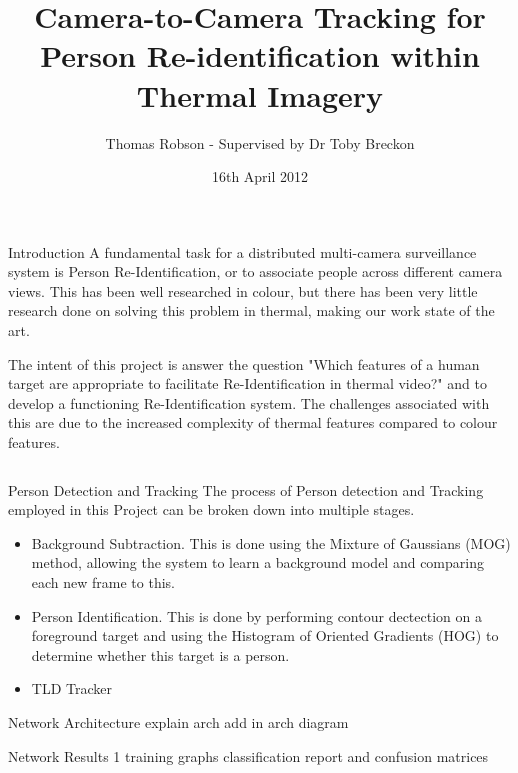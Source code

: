 \documentclass[final]{beamer}
\title[Thermal Re-ID]{Camera-to-Camera Tracking for Person Re-identification within Thermal Imagery}
\author[G Ingram]{Thomas Robson - Supervised by Dr Toby Breckon}
\institute[Durham]{School of Computer Science, Durham University}
\date{16th April 2012}
\begin{document}
  \begin{frame}{} 

  \vfill
  \begin{block}{Introduction}
          A fundamental task for a distributed multi-camera surveillance system is Person Re-Identification, or to associate people across different camera views. This has been well researched in colour, but there has been very little research done on solving this problem in thermal, making our work state of the art. 

The intent of this project is answer the question "Which features of a human target are appropriate to facilitate Re-Identification in thermal video?" and to develop a functioning Re-Identification system. The challenges associated with this are due to the increased complexity of thermal features compared to colour features.
        \end{block}
        
    \begin{columns}[t]
      \begin{column}{.49\linewidth}
        
        \begin{block}{Person Detection and Tracking}
        	The process of Person detection and Tracking employed in this Project can be broken down into multiple stages. 
        	\begin{itemize}
        	\item Background Subtraction. This is done using the Mixture of Gaussians (MOG) method, allowing the system to learn a background model and comparing each new frame to this. 

        	\item Person Identification. This is done by performing contour dectection on a foreground target and using the Histogram of Oriented Gradients (HOG) to determine whether this target is a person.
        	
        	\item TLD Tracker
          \end{itemize}
        \end{block}
       


        \begin{block}{Network Architecture}
		explain arch
		add in arch diagram
          
        \end{block}
	
        \begin{block}{Network Results 1}
		training graphs
		classification report and confusion matrices


\end{block}
\end{column}
\end{columns}
\end{frame}
\end{document}
